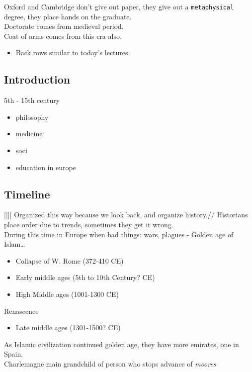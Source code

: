 \documentclass[11pt]{article}
\begin{document}
Oxford and Cambridge don't give out paper, they give out a \texttt{metaphysical} degree, they place hands on the graduate.\\
Doctorate comes from medieval period.\\
Coat of arms comes from this era also.\\

\begin{itemize}
\item Back rows similar to today's lectures.
\end{itemize}

\subsection{Introduction}
\label{sec-7-2}
5th - 15th century \\
\begin{itemize}
\item philosophy
\item medicine
\item soci
\item education in europe
\end{itemize}

\subsection{Timeline}
\label{sec-7-3}
[[]]
Organized this way because we look back, and organize history.//
Historians place order due to trends, sometimes they get it wrong.\\
During this time in Europe when bad things: wars, plagues - Golden age of Islam\ldots{}

\begin{itemize}
\item Collapse of W. Rome (372-410 CE)\\
\item Early middle ages (5th to 10th Century? CE)\\
\item High Middle ages (1001-1300 CE) \\
\end{itemize}
Renascence
\begin{itemize}
\item Late middle ages (1301-1500? CE)\\
\end{itemize}


As Islamic civilization continued golden age, they have more emirates, one in Spain.\\
Charlemagne main grandchild of person who stops advance of \emph{moores} 
\end{document}
